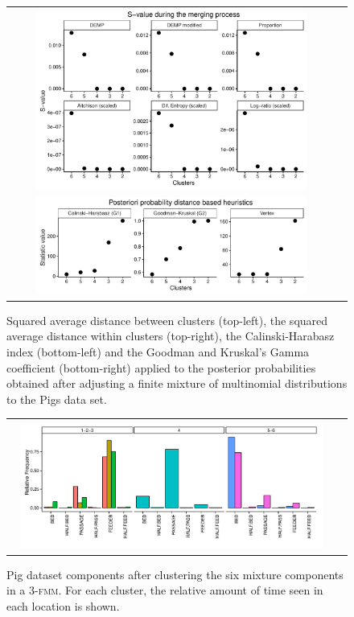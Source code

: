 \documentclass[submit]{smj}
\theoremstyle{definition}
\newcommand{\fmm}{\textsc{fmm}\xspace}
\begin{document}
\begin{figure}[thpb]
\begin{center}
\begin{tabular}{cc}
  \includegraphics[width=0.85\textwidth]{figures/multinomial_Svalues_all.pdf} \\
  \includegraphics[width=0.85\textwidth]{figures/multinomial_statistics.pdf} 
 \end{tabular}
 \caption{Squared average distance between clusters (top-left), the squared average distance within clusters (top-right), the Calinski-Harabasz index (bottom-left) and the Goodman and Kruskal's Gamma coefficient (bottom-right) applied to the posterior probabilities obtained after adjusting a finite mixture of multinomial distributions to the Pigs data set.}\label{multinomial_statistics}
\end{center}
\end{figure}

\begin{figure}[htpb]
\begin{center}
\begin{tabular}{cc}
  \includegraphics[width=0.95\textwidth]{figures/multinomial_clust3_all.pdf} \\
 \end{tabular}
 \caption{Pig dataset components after clustering the six mixture components in a 3-\fmm. For each cluster, the relative amount of time seen in each location is shown.}\label{multinomial_clust3}
\end{center}
\end{figure}
\end{document}
